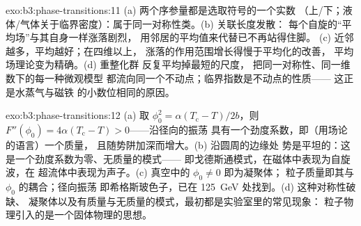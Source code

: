 \begin{solution}{exo:b3:phase-transitions:11}
(a) 两个序参量都是选取符号的一个实数
（上/下；液体/气体关于临界密度）：属于同一对称性类。(b) 关联长度发散：
每个自旋的“平均场”与其自身一样涨落剧烈，
用邻居的平均值来代替已不再站得住脚。
(c) 近邻越多，平均越好；在四维以上，
涨落的作用范围增长得慢于平均化的改善，
平均场理论变为精确。(d) 重整化群
反复平均掉最短的尺度，
把同一对称性、同一维数下的每一种微观模型
都流向同一个不动点；临界指数是不动点的性质——
这正是水蒸气与磁铁
的小数位相同的原因。
\end{solution}

\begin{solution}{exo:b3:phase-transitions:12}
(a) 取 $\phi_0^2 = \alpha(T_{\text{c}} - T)/2b$，则 $F''(\phi_0) =
4\alpha(T_{\text{c}} - T) > 0$——沿径向的振荡
具有一个劲度系数，即（用场论的语言）一个质量，
且随势阱加深而增大。(b) 沿圆周的边缘处
势是平坦的：这是一个劲度系数为零、无质量的模式——
即戈德斯通模式，在磁体中表现为自旋波，在
超流体中表现为声子。(c) 真空中的 $\phi_0 \neq 0$ 即为凝聚体；
粒子质量即其与 $\phi_0$ 的耦合；径向振荡
即希格斯玻色子，已在 \qty{125}{GeV} 处找到。(d) 这种对称性破缺、
凝聚体以及有质量与无质量的模式，最初都是实验室里的常见现象：
粒子物理引入的是一个固体物理的思想。
\end{solution}


